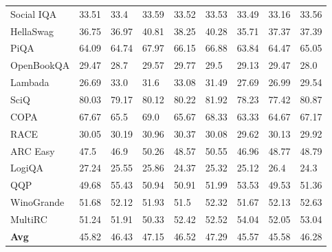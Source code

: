 \documentclass{article}
\theoremstyle{definition}
\theoremstyle{remark}
\begin{document}
\begin{table}[!ht]
\begin{tabular}{lllllllll}
        Social IQA & 33.51 & 33.4 & 33.59 & 33.52 & 33.53 & 33.49 & 33.16 & 33.56 \\ 
        HellaSwag & 36.75 & 36.97 & 40.81 & 38.25 & 40.28 & 35.71 & 37.37 & 37.39 \\ 
        PiQA & 64.09 & 64.74 & 67.97 & 66.15 & 66.88 & 63.84 & 64.47 & 65.05 \\ 
        OpenBookQA & 29.47 & 28.7 & 29.57 & 29.77 & 29.5 & 29.13 & 29.47 & 28.0 \\ 
        Lambada & 26.69 & 33.0 & 31.6 & 33.08 & 31.49 & 27.69 & 26.99 & 29.54 \\ 
        SciQ & 80.03 & 79.17 & 80.12 & 80.22 & 81.92 & 78.23 & 77.42 & 80.87 \\ 
        COPA & 67.67 & 65.5 & 69.0 & 65.67 & 68.33 & 63.33 & 64.67 & 67.17 \\ 
        RACE & 30.05 & 30.19 & 30.96 & 30.37 & 30.08 & 29.62 & 30.13 & 29.92 \\ 
        ARC Easy & 47.5 & 46.9 & 50.26 & 48.57 & 50.55 & 46.96 & 48.77 & 48.79 \\ 
        LogiQA & 27.24 & 25.55 & 25.86 & 24.37 & 25.32 & 25.12 & 26.4 & 24.3 \\ 
        QQP & 49.68 & 55.43 & 50.94 & 50.91 & 51.99 & 53.53 & 49.53 & 51.36 \\ 
        WinoGrande & 51.68 & 52.12 & 51.93 & 51.5 & 52.32 & 51.67 & 52.13 & 52.63 \\ 
        MultiRC & 51.24 & 51.91 & 50.33 & 52.42 & 52.52 & 54.04 & 52.05 & 53.04 \\ 
        \midrule
        \textbf{Avg} & 45.82 & 46.43 & 47.15 & 46.52 & 47.29 & 45.57 & 45.58 & 46.28 \\ \bottomrule 
    \end{tabular}
\end{table}
\end{document}
